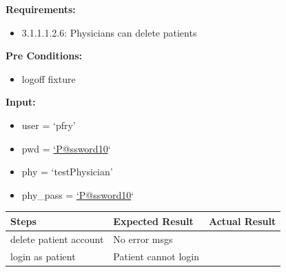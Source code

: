 \documentclass[letterpaper,10pt,english]{sphinxmanual}
\begin{document}
\begin{fulllineitems}
\label{STD/test_create_account:test_create_account.test_delete_patient}
\textbf{Requirements:}
\begin{itemize}
\item {} 
3.1.1.1.2.6: Physicians can delete patients

\end{itemize}

\textbf{Pre Conditions:}
\begin{itemize}
\item {} 
logoff fixture

\end{itemize}

\textbf{Input:}
\begin{itemize}
\item {} 
user = `pfry'

\item {} 
pwd = \href{mailto:'P@ssword10}{`P@ssword10}`

\item {} 
phy = `testPhysician'

\item {} 
phy\_pass = \href{mailto:'P@ssword10}{`P@ssword10}`

\end{itemize}

\begin{tabulary}{\linewidth}{|L|L|L|}
\hline
\textsf{\relax 
Steps
} & \textsf{\relax 
Expected Result
} & \textsf{\relax 
Actual Result
}\\
\hline
delete patient account
 & 
No error msgs
 & \\
\hline
login as patient
 & 
Patient cannot login
 & \\
\hline\end{tabulary}


\end{fulllineitems}

\end{document}
